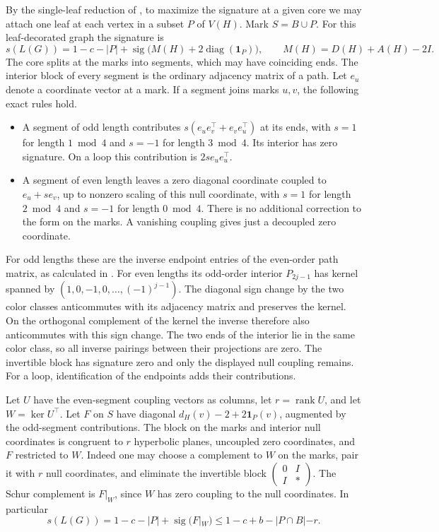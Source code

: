 \documentclass[11pt]{article}
\newcommand{\sg}{\operatorname{sig}}
\newcommand{\diag}{\operatorname{diag}}
\begin{document}
By the single-leaf reduction of \cite{first}, to maximize the signature at a given core we may attach one leaf at each vertex in a subset $P$ of $V(H)$. Mark $S=B\cup P$. For this leaf-decorated graph the signature is
\[
s(L(G))=1-c-|P|+\sg\big(M(H)+2\diag(\mathbf1_P)\big),\qquad M(H)=D(H)+A(H)-2I.
\]
The core splits at the marks into segments, which may have coinciding ends. The interior block of every segment is the ordinary adjacency matrix of a path. Let $e_u$ denote a coordinate vector at a mark. If a segment joins marks $u,v$, the following exact rules hold.
\begin{itemize}
\item A segment of odd length contributes $s(e_ue_v^\top+e_ve_u^\top)$ at its ends, with $s=1$ for length $1\bmod4$ and $s=-1$ for length $3\bmod4$. Its interior has zero signature. On a loop this contribution is $2s e_ue_u^\top$.
\item A segment of even length leaves a zero diagonal coordinate coupled to $e_u+s e_v$, up to nonzero scaling of this null coordinate, with $s=1$ for length $2\bmod4$ and $s=-1$ for length $0\bmod4$. There is no additional correction to the form on the marks. A vanishing coupling gives just a decoupled zero coordinate.
\end{itemize}
For odd lengths these are the inverse endpoint entries of the even-order path matrix, as calculated in \cite{first}. For even lengths its odd-order interior $P_{2j-1}$ has kernel spanned by $(1,0,-1,0,\ldots,(-1)^{j-1})$. The diagonal sign change by the two color classes anticommutes with its adjacency matrix and preserves the kernel. On the orthogonal complement of the kernel the inverse therefore also anticommutes with this sign change. The two ends of the interior lie in the same color class, so all inverse pairings between their projections are zero. The invertible block has signature zero and only the displayed null coupling remains. For a loop, identification of the endpoints adds their contributions.

Let $U$ have the even-segment coupling vectors as columns, let $r=\operatorname{rank} U$, and let $W=\ker U^\top$. Let $F$ on $S$ have diagonal $d_H(v)-2+2\mathbf1_P(v)$, augmented by the odd-segment contributions. The block on the marks and interior null coordinates is congruent to $r$ hyperbolic planes, uncoupled zero coordinates, and $F$ restricted to $W$. Indeed one may choose a complement to $W$ on the marks, pair it with $r$ null coordinates, and eliminate the invertible block $\left(\begin{smallmatrix}0&I\\I&*\end{smallmatrix}\right)$. The Schur complement is $F|_W$, since $W$ has zero coupling to the null coordinates. In particular
\begin{equation}\label{eq:main}
s(L(G))=1-c-|P|+\sg(F|_W)
   \le1-c+b-|P\cap B|-r.
\end{equation}
\end{document}
